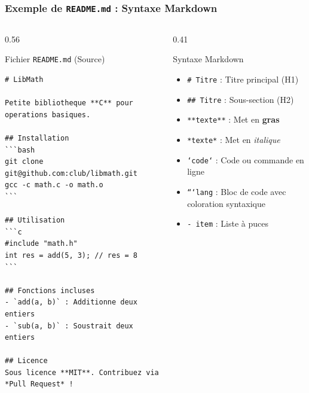 \documentclass[
	11pt,
	aspectratio=169
]{beamer}
\begin{document}
\begin{frame}[fragile]
    \frametitle{Exemple de \texttt{README.md} : Syntaxe Markdown}

    \vspace{-1cm}

    \begin{columns}[t]
        \begin{column}{0.56\textwidth}
            \begin{block}{\footnotesize Fichier \texttt{README.md} (Source)}
\begin{lstlisting}[basicstyle=\ttfamily\fontsize{5.2}{6.2}\selectfont]
# LibMath

Petite bibliotheque **C** pour operations basiques.

## Installation
```bash
git clone git@github.com:club/libmath.git
gcc -c math.c -o math.o
```

## Utilisation
```c
#include "math.h"
int res = add(5, 3); // res = 8
```

## Fonctions incluses
- `add(a, b)` : Additionne deux entiers
- `sub(a, b)` : Soustrait deux entiers

## Licence
Sous licence **MIT**. Contribuez via *Pull Request* !
\end{lstlisting}
            \end{block}
        \end{column}

        \begin{column}{0.41\textwidth}
            \begin{exampleblock}{\footnotesize Syntaxe Markdown}
                \scriptsize
                \begin{itemize}
                    \item \texttt{\# Titre} : Titre principal (H1)
                    \item \texttt{\#\# Titre} : Sous-section (H2)
                    \item \texttt{**texte**} : Met en \textbf{gras}
                    \item \texttt{*texte*} : Met en \textit{italique}
                    \item \texttt{`code`} : Code ou commande en ligne
                    \item \texttt{```lang} : Bloc de code avec coloration syntaxique
                    \item \texttt{- item} : Liste à puces
                \end{itemize}
            \end{exampleblock}
        \end{column}
    \end{columns}
\end{frame}
\end{document}
